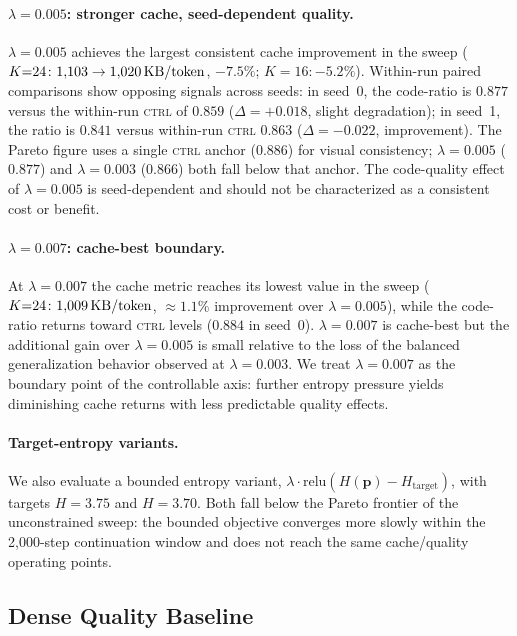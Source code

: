 \paragraph{$\lambda{=}0.005$: stronger cache, seed-dependent quality.}
$\lambda = 0.005$ achieves the largest consistent cache improvement in the sweep
($K{=}24\colon 1{,}103 \to 1{,}020\,\text{KB/token}$, $-7.5\%$; $K{=}16\colon -5.2\%$).
Within-run paired comparisons show opposing signals across seeds: in seed~0, the code-ratio
is $0.877$ versus the within-run \textsc{ctrl} of $0.859$ ($\Delta = +0.018$, slight
degradation); in seed~1, the ratio is $0.841$ versus within-run \textsc{ctrl} $0.863$
($\Delta = -0.022$, improvement).
The Pareto figure uses a single \textsc{ctrl} anchor ($0.886$) for visual consistency;
$\lambda{=}0.005$ ($0.877$) and $\lambda{=}0.003$ ($0.866$) both fall below that anchor.
The code-quality effect of $\lambda = 0.005$ is seed-dependent and should not be
characterized as a consistent cost or benefit.

\paragraph{$\lambda{=}0.007$: cache-best boundary.}
At $\lambda = 0.007$ the cache metric reaches its lowest value in the sweep
($K{=}24\colon 1{,}009\,\text{KB/token}$, ${\approx}1.1\%$ improvement over $\lambda{=}0.005$), while
the code-ratio returns toward \textsc{ctrl} levels ($0.884$ in seed~0).
$\lambda{=}0.007$ is cache-best but the additional gain over $\lambda{=}0.005$ is small
relative to the loss of the balanced generalization behavior observed at $\lambda{=}0.003$.
We treat $\lambda{=}0.007$ as the boundary point of the controllable axis: further entropy
pressure yields diminishing cache returns with less predictable quality effects.

\paragraph{Target-entropy variants.}
We also evaluate a bounded entropy variant,
$\lambda \cdot \mathrm{relu}(H(\mathbf{p}) - H_{\mathrm{target}})$, with targets
$H = 3.75$ and $H = 3.70$.
Both fall below the Pareto frontier of the unconstrained sweep: the bounded objective
converges more slowly within the 2,000-step continuation window and does not reach the
same cache/quality operating points.

\subsection{Dense Quality Baseline}
\label{sec:dense}

